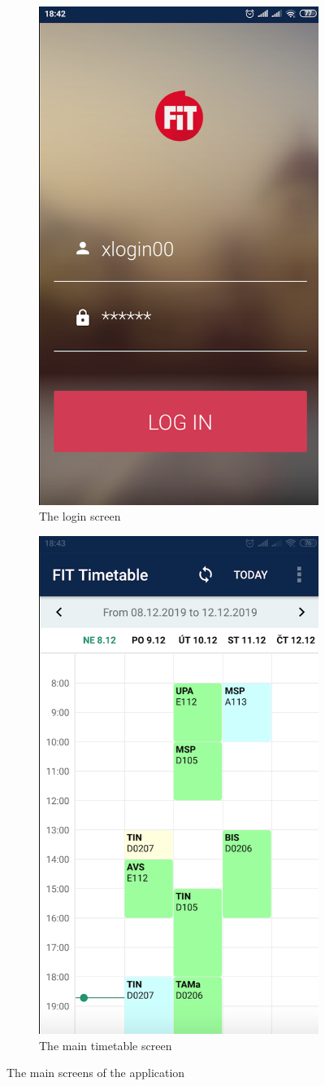 \documentclass[12pt, a4paper, titlepage, final]{article}
\begin{document}
\begin{figure}[ht]
	\centering
	\begin{subfigure}{.48 \textwidth}
		\centering
		\includegraphics[width=.5 \linewidth, frame]{img/login.png}
		\caption{The login screen}
		\label{fig:activity-login}
	\end{subfigure}
	\begin{subfigure}{.48 \textwidth}
		\centering
		\includegraphics[width=.5 \linewidth, frame]{img/timetable.png}
		\caption{The main timetable screen}
		\label{fig:activity-timetable}
	\end{subfigure}

	\caption{The main screens of the application}
	\label{fig:main-activities}
\end{figure}
\end{document}
